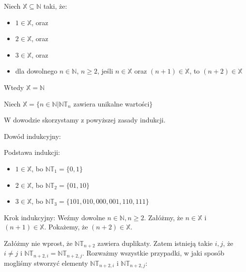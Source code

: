 Niech $\mathbb{X} \subseteq \mathbb{N}$ taki, że:
\begin{itemize}
	\item $1 \in \mathbb{X}$, oraz
	\item $2 \in \mathbb{X}$, oraz
	\item $3 \in \mathbb{X}$, oraz
	\item dla dowolnego $n \in \mathbb{N}$, $n \geq 2$, jeśli $n \in \mathbb{X}$ oraz $(n + 1) \in \mathbb{X}$, to $(n + 2) \in \mathbb{X}$
\end{itemize}
Wtedy $\mathbb{X} = \mathbb{N}$
\n

\noindent
Niech $\mathbb{X} = \{n \in \mathbb{N} | \mathbb{NT}_n$ zawiera unikalne wartości$\}$
\n

\noindent
W dowodzie skorzystamy z powyższej zasady indukcji.
\n

\noindent
Dowód indukcyjny:
\n

\noindent
Podstawa indukcji:
\begin{itemize}
\item $1 \in \mathbb{X}$, bo $\mathbb{NT}_1 = \{0, 1\}$
\item $2 \in \mathbb{X}$, bo $\mathbb{NT}_2 = \{01, 10\}$
\item $3 \in \mathbb{X}$, bo $\mathbb{NT}_3 = \{101, 010, 000, 001, 110, 111\}$
\end{itemize}

\noindent
Krok indukcyjny:
\n
\noindent
Weźmy dowolne $n \in \mathbb{N}, n \geq 2$. Załóżmy, że $n \in \mathbb{X}$ i $(n + 1) \in \mathbb{X}$. Pokażemy, że $(n + 2) \in \mathbb{X}$.
\n

\noindent
Załóżmy nie wprost, że $\mathbb{NT}_{n + 2}$ zawiera duplikaty. Zatem istnieją takie $i, j$, że $i \neq j$ i $\mathbb{NT}_{n + 2, i} = \mathbb{NT}_{n + 2, j}$. Rozważmy wszystkie przypadki, w jaki sposób mogliśmy stworzyć elementy $\mathbb{NT}_{n + 2, i}$ i $\mathbb{NT}_{n + 2, j}$:

